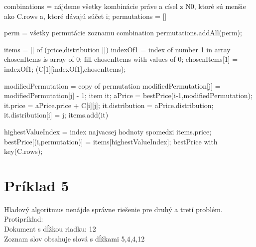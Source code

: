 \documentclass[paper=a4, fontsize=11pt]{scrartcl} %
\numberwithin{equation}{section} %
\numberwithin{figure}{section} %
\numberwithin{table}{section} %
\begin{document}
\begin{algorithmic}[1]
        \State combinations = nájdeme všetky kombinácie práve a císel z N0, ktoré sú menšie ako C.rows a, ktoré dávajú súčet i;
        \State permutations = []
        
	    \State perm = všetky permutácie zoznamu combination
	    \State permutations.addAll(perm);
        \EndFor
		
            \State items = [] of (price,distribution [])
                \State indexOf1 = index of number 1 in array
                \State chosenItems is array of 0;
                \State fill chosenItems with values of 0;
                \State chosenItems[1] = indexOf1;
                \State \Return (C[1][indexOf1],chosenItems);
            \EndIf
            
                \State modifiedPermutation = copy of permutation
		    \State modifiedPermutation[j] = modifiedPermutation[j] - 1;
		    \State	item it;
		    \State aPrice = bestPrice(i-1,modifiedPermutation);
		    \State it.price = aPrice.price + C[i][j];
		    \State it.distribution = aPrice.distribution;
		    \State it.distribution[i] = j;
                    \State items.add(it)
                 \EndIf
            \EndFor			
		
            \State highestValueIndex = index najvacsej hodnoty spomedzi items.price;
            \State bestPrice[(i,permutation)] = items[highestValueIndex];		
        \EndFor
    \EndFor
    \State \Return bestPrice with key(C.rows);
\EndFunction
\end{algorithmic}


\pagebreak


\section*{Príklad 5}

Hladový algoritmus nenájde správne riešenie pre druhý a tretí problém. \\
Protipríklad: \\
Dokument s dĺžkou riadku: 12 \\
Zoznam slov obsahuje slová s dĺžkami 5,4,4,12 \\
\end{document}
